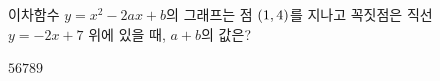 이차함수 $y=x^2-2ax+b$의 그래프는 점 $(1{,}\mkern3mu 4)$를 지나고 꼭짓점은 직선 $y=-2x+7$ 위에 있을 때, $a+b$의 값은? 
\begin{choices32}{$5$}{$6$}{$7$}{$8$}{$9$}\end{choices32}
